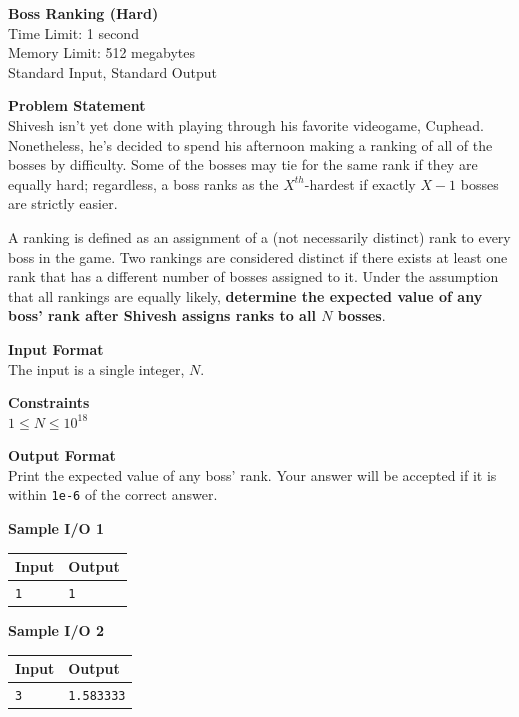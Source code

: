 \documentclass{article}
\begin{document}
\begin{center}
{\LARGE \bf Boss Ranking (Hard)}\\
{\large Time Limit: 1 second}\\
{\large Memory Limit: 512 megabytes}\\
Standard Input, Standard Output
\end{center}

{\noindent \bf Problem Statement}\\
Shivesh isn't yet done with playing through his favorite videogame, Cuphead. Nonetheless, he's decided to spend his afternoon making a ranking of all of the bosses by difficulty. Some of the bosses may tie for the same rank if they are equally hard; regardless, a boss ranks as the $X^{th}$-hardest if exactly $X - 1$ bosses are strictly easier. \newline

\noindent A ranking is defined as an assignment of a (not necessarily distinct) rank to every boss in the game. Two rankings are considered distinct if there exists at least one rank that has a different number of bosses assigned to it. Under the assumption that all rankings are equally likely, \textbf{determine the expected value of any boss' rank after Shivesh assigns ranks to all $N$ bosses}. \newline

{\noindent \bf Input Format}\\
The input is a single integer, $N$. \newline

{\noindent \bf Constraints}\\
$1 \leq N \leq 10^{18}$ \newline

{\noindent \bf Output Format}\\
Print the expected value of any boss' rank. Your answer will be accepted if it is within \texttt{1e{-6}} of the correct answer. \newline

{\noindent \bf Sample I/O 1}\\
\begin{tabular}{|p{}|p{}|}
    \hline
    \textbf{Input} & \textbf{Output}\\
    \hline
    \texttt{1}
    &
    \texttt{1}\\
    \hline
\end{tabular} \newline \newline

{\noindent \bf Sample I/O 2}\\
\begin{tabular}{|p{}|p{}|}
    \hline
    \textbf{Input} & \textbf{Output}\\
    \hline
    \texttt{3}
    &
    \texttt{1.583333}\\
    \hline
\end{tabular} \newline \newline
\end{document}
